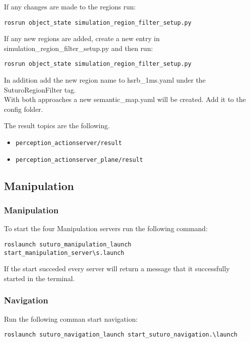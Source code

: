 \documentclass[main.tex]{subfiles}
\begin{document}
If any changes are made to the regions run:\\
\begin{lstlisting}
rosrun object_state simulation_region_filter_setup.py
\end{lstlisting}
If any new regions are added, create a new entry in simulation\_region\_filter\_setup.py and then run:\\
\begin{lstlisting}
rosrun object_state simulation_region_filter_setup.py
\end{lstlisting}
In addition add the new region name to hsrb\_1ms.yaml under the SuturoRegionFilter tag.\\
With both approaches a new semantic\_map.yaml will be created. Add it to the config folder.

The result topics are the following.\\
\begin{itemize}
\item \begin{verbatim}
perception_actionserver/result
\end{verbatim}
\item \begin{verbatim}
perception_actionserver_plane/result
\end{verbatim}
\end{itemize}

	
	\subsection{Manipulation}
	\subsubsection{Manipulation}
	To start the four Manipulation servers run the following command:\\
	\begin{lstlisting}
roslaunch suturo_manipulation_launch start_manipulation_server\s.launch
\end{lstlisting}
	If the start succeded every server will return a message that it successfully started in the terminal.	
	
	\subsubsection{Navigation}
	Run the following comman start navigation:\\
	\begin{lstlisting}
roslaunch suturo_navigation_launch start_suturo_navigation.\launch
\end{lstlisting}
	
\end{document}
